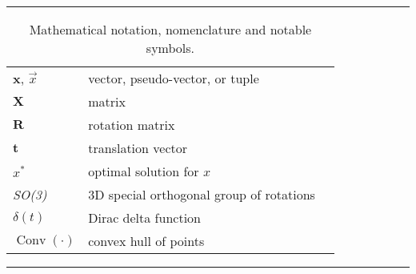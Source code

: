 \begin{table*}[!h]
  \centering
  \noindent\rule{\textwidth}{0.5pt}
  \begin{tabular}{lll}
    $\mathbf{x}$, $\vec{x}$ & vector, pseudo-vector, or tuple\\
    $\mathbf{X}$ & matrix \\
    $\mathbf{R}$ & rotation matrix \\
    $\mathbf{t}$ & translation vector \\
    $x^{*}$ & optimal solution for $x$ \\
    \emph{SO(3)} & 3D special orthogonal group of rotations\\
    $\delta(t)$ & Dirac delta function \\
    $\operatorname{Conv}(\cdot)$ & convex hull of points \\
  \end{tabular}
  \noindent\rule{\textwidth}{0.5pt}
  \caption{Mathematical notation, nomenclature and notable symbols.}
  \label{tab:mathematical_notation}
\end{table*}

